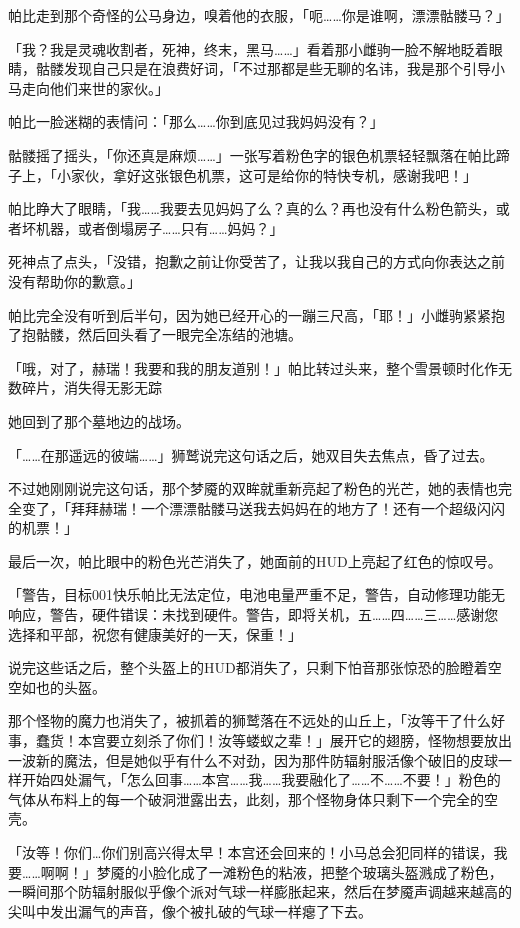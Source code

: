 帕比走到那个奇怪的公马身边，嗅着他的衣服，「呃……你是谁啊，漂漂骷髅马？」

「我？我是灵魂收割者，死神，终末，黑马……」看着那小雌驹一脸不解地眨着眼睛，骷髅发现自己只是在浪费好词，「不过那都是些无聊的名讳，我是那个引导小马走向他们来世的家伙。」

帕比一脸迷糊的表情问：「那么……你到底见过我妈妈没有？」

骷髅摇了摇头，「你还真是麻烦……」一张写着粉色字的银色机票轻轻飘落在帕比蹄子上，「小家伙，拿好这张银色机票，这可是给你的特快专机，感谢我吧！」

帕比睁大了眼睛，「我……我要去见妈妈了么？真的么？再也没有什么粉色箭头，或者坏机器，或者倒塌房子……只有……妈妈？」

死神点了点头，「没错，抱歉之前让你受苦了，让我以我自己的方式向你表达之前没有帮助你的歉意。」

帕比完全没有听到后半句，因为她已经开心的一蹦三尺高，「耶！」小雌驹紧紧抱了抱骷髅，然后回头看了一眼完全冻结的池塘。

「哦，对了，赫瑞！我要和我的朋友道别！」帕比转过头来，整个雪景顿时化作无数碎片，消失得无影无踪

她回到了那个墓地边的战场。

\horizonline

「……在那遥远的彼端……」狮鹫说完这句话之后，她双目失去焦点，昏了过去。

不过她刚刚说完这句话，那个梦魇的双眸就重新亮起了粉色的光芒，她的表情也完全变了，「拜拜赫瑞！一个漂漂骷髅马送我去妈妈在的地方了！还有一个超级闪闪的机票！」

最后一次，帕比眼中的粉色光芒消失了，她面前的HUD上亮起了红色的惊叹号。

「{\mt 警告，目标001快乐帕比无法定位，电池电量严重不足，警告，自动修理功能无响应，警告，硬件错误：未找到硬件。警告，即将关机，五……四……三……感谢您选择和平部，祝您有健康美好的一天，保重！}」

说完这些话之后，整个头盔上的HUD都消失了，只剩下怕音那张惊恐的脸瞪着空空如也的头盔。

那个怪物的魔力也消失了，被抓着的狮鹫落在不远处的山丘上，「汝等干了什么好事，蠢货！本宫要立刻杀了你们！汝等蝼蚁之辈！」展开它的翅膀，怪物想要放出一波新的魔法，但是她似乎有什么不对劲，因为那件防辐射服活像个破旧的皮球一样开始四处漏气，「怎么回事……本宫……我……我要融化了……不……不要！」粉色的气体从布料上的每一个破洞泄露出去，此刻，那个怪物身体只剩下一个完全的空壳。

「汝等！你们\ldots 你们别高兴得太早！本宫还会回来的！小马总会犯同样的错误，我要……啊啊！」梦魇的小脸化成了一滩粉色的粘液，把整个玻璃头盔溅成了粉色，一瞬间那个防辐射服似乎像个派对气球一样膨胀起来，然后在梦魇声调越来越高的尖叫中发出漏气的声音，像个被扎破的气球一样瘪了下去。

